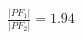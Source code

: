 \documentclass[preview]{standalone}
\begin{document}
\begin{align*}
\frac{|PF_1|}{|PF_2|} = 1.94
\end{align*}
\end{document}
